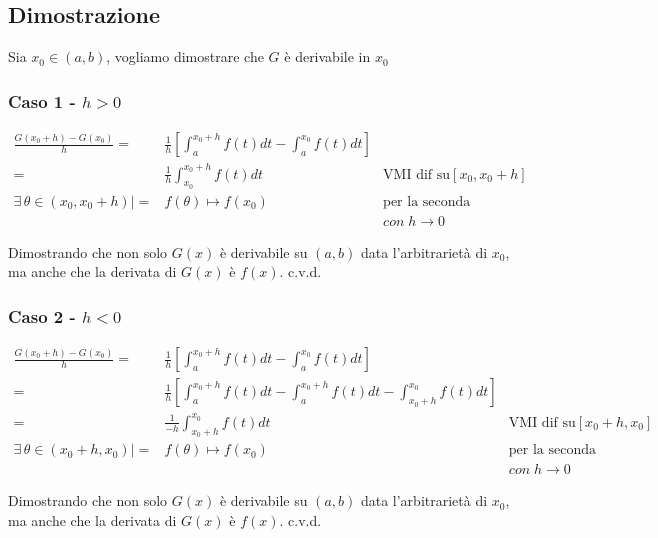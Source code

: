 \documentclass[../dimostrazioni]{subfiles}
\begin{document}
                    \subsection*{Dimostrazione}

                        Sia \(x_0 \in (a,b) \), vogliamo dimostrare che \(G\) è derivabile in \(x_0\)


                        \subsubsection*{Caso 1 - \(h>0\)}

                            \begin{align*}
                                \frac{G(x_0+h) - G(x_0)}{h} =& \frac{1}{h} \left[ \int_{a}^{x_0+h} f(t) dt - \int_{a}^{x_0} f(t)dt \right] \\
                                                            =& \frac{1}{h} \int_{x_0}^{x_0+h}f(t) dt & \text{VMI dif su} [x_0, {x_0} +h]\\
                                \exists \, \theta \in (x_0, x_0+h) | =& f(\theta) \longmapsto f(x_0)          & \text{per la seconda proprietà del VMI}& \\
                                &                            &  con \; h \rightarrow 0&
                            \end{align*}
                            
                            Dimostrando che non solo \(G(x)\) è derivabile su \((a,b)\) data l'arbitrarietà di \(x_0\), 
                            ma anche che la derivata di \(G(x)\) è \(f(x)\). c.v.d.

                        \subsubsection*{Caso 2 - \(h<0\)}

                            \begin{align*}
                                \frac{G(x_0+h) - G(x_0)}{h} =& \frac{1}{h} \left[ \int_{a}^{x_0+h} f(t) dt - \int_{a}^{x_0} f(t)dt \right] \\
                                                            =& \frac{1}{h} \left[ \int_{a}^{x_0+h} f(t) dt - \int_{a}^{x_0+h} f(t)dt -\int_{x_0+h}^{x_0} f(t)dt \right] \\
                                                            =& \frac{1}{-h} \int_{x_0+h}^{x_0}f(t) dt & \text{VMI dif su} [x_0 + h, x_0]\\
                                \exists \, \theta \in (x_0+h, x_0) | =& f(\theta) \longmapsto f(x_0)          & \text{per la seconda proprietà del VMI}& \\
                                &                            &  con \; h \rightarrow 0&
                            \end{align*}
                            
                            Dimostrando che non solo \(G(x)\) è derivabile su \((a,b)\) data l'arbitrarietà di \(x_0\), 
                            ma anche che la derivata di \(G(x)\) è \(f(x)\). c.v.d.            
\end{document}
